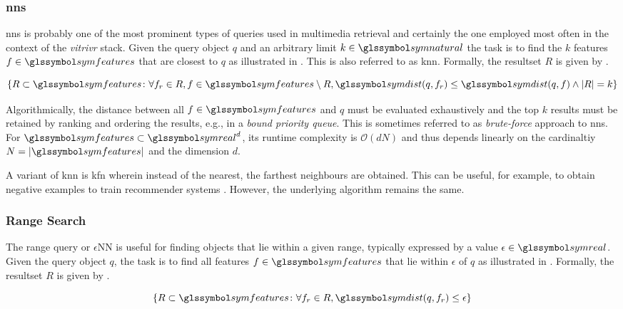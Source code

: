 \subsubsection{\acrfull{nns}}

\acrshort{nns} is probably one of the most prominent types of queries used in multimedia retrieval and certainly the one employed most often in the context of the \emph{vitrivr} \cite{Rossetto:2016vitrivr,Gasser:2019Multimodal} stack. Given the query object $q$ and an arbitrary limit $k \in \symnatural$ the task is to find the $k$ features $f \in \symfeatures$ that are closest to $q$ as illustrated in . This is also referred to as \acrfull{knn}. Formally, the resultset $R$ is given by .

\begin{equation}
    \label{eq:knn}
    \lbrace R \subset \symfeatures \colon \forall f_r \in R, f \in \symfeatures \setminus R, \symdist(q,f_r) \leq \symdist(q,f) \wedge |R| = k \rbrace
\end{equation}

Algorithmically, the distance between all $f \in \symfeatures$ and $q$ must be evaluated exhaustively and the top $k$ results must be retained by ranking and ordering the results, e.g., in a \emph{bound priority queue}. This is sometimes referred to as \emph{brute-force} approach to \acrshort{nns}. For $\symfeatures \subset \symreal^d$, its runtime complexity is $\mathcal{O}(dN)$ and thus depends linearly on the cardinaltiy $N = |\symfeatures|$ and the dimension $d$. 

A variant of \acrshort{knn} is \acrfull{kfn} wherein instead of the nearest, the farthest neighbours are obtained. This can be useful, for example, to obtain negative examples to train recommender systems \cite{Pagh:2015Approximate}. However, the underlying algorithm remains the same.

\subsubsection{Range Search}

The range query or $\epsilon$NN is useful for finding objects that lie within a given range, typically expressed by a value $\epsilon \in \symreal$. Given the query object $q$, the task is to find all features $f \in \symfeatures$ that lie within $\epsilon$ of $q$ as illustrated in . Formally, the resultset $R$ is given by .

\begin{equation}
    \label{eq:epsilonnn}
    \lbrace R \subset \symfeatures \colon \forall f_r \in R, \symdist(q,f_r) \leq \epsilon \rbrace
\end{equation}

